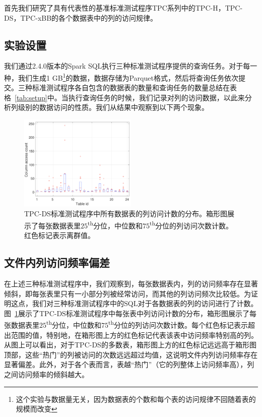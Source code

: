 \par 首先我们研究了具有代表性的基准标准测试程序TPC系列中的TPC-H，TPC-DS，TPC-xBB的各个数据表中的列的访问规律。

\subsection{实验设置}

\par 我们通过2.4.0版本的Spark SQL执行三种标准测试程序提供的查询任务。对于每一种，我们生成1 GB\footnote{这个实验与数据量无关，因为数据表的个数和每个表的访问规律不回随着表的规模而改变}的数据，数据存储为Parquet格式，然后将查询任务依次提交。三种标准测试程序各自包含的数据表的数量和查询任务的数量总结在表格~\ref{tab:setup}中。当执行查询任务的时候，我们记录对列的访问数据，以此来分析列级别的数据访问的性质。我们从结果中观察到以下两个现象。

\begin{figure}[t]
	\centering
	\includegraphics[width=0.5\textwidth]{img/motivation/column-pop}
	\caption{TPC-DS标准测试程序中所有数据表的列访问计数的分布。箱形图展示了每张数据表里$25$\textsuperscript{th}分位，中位数和$75$\textsuperscript{th}分位的列访问次数计数。红色标记表示离群值。}
	\label{fig:tpc-ds-column-pop}
\end{figure}

\subsection{文件内列访问频率偏差}

\par 在上述三种标准测试程序中，我们观察到，每张数据表内，列的访问频率存在显著倾斜，即每张表里只有一小部分列被经常访问，而其他的列访问频次比较低。为证明这点，我们对三种标准测试程序中的SQL对于各数据表的列的访问进行了计数。图~\ref{fig:tpc-ds-column-pop}展示了TPC-DS标准测试程序中每张表中列访问计数的分布，箱形图展示了每张数据表里$25$\textsuperscript{th}分位，中位数和$75$\textsuperscript{th}分位的列访问次数计数。每个红色标记表示超出范围的值，特别地，在箱形图上方的红色标记代表该表中访问频率特别高的列。从图上可以看出，对于TPC-DS的多数表，箱形图上方的红色标记远远高于箱形图顶部，这些“热门”的列被访问的次数远远超过均值，这说明文件内列访问频率存在显著偏差。此外，对于各个表而言，表越“热门”（它的列整体上访问频率高），列之间访问频率的倾斜越大。

